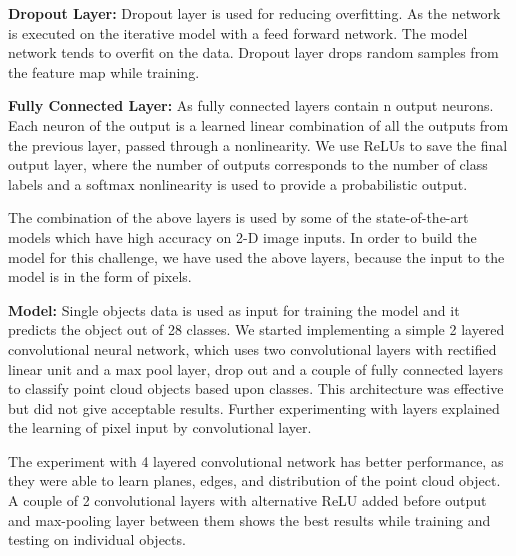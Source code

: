 \textbf{Dropout Layer:}
Dropout layer is used for reducing overfitting. As the network is executed on the iterative model with a feed forward network.
The model network tends to overfit on the data. Dropout layer drops random samples from the feature
map while training.

\textbf{Fully Connected Layer:}
As fully connected layers contain n output neurons. Each neuron of the output is a learned linear
combination of all the outputs from the previous layer, passed through a nonlinearity.
We use ReLUs to save the final output layer, where the number of outputs corresponds
to the number of class labels and a softmax nonlinearity is used to provide a probabilistic output.



The combination of the above layers is used by some of the state-of-the-art models which have high accuracy on 2-D image inputs.
In order to build the model for this challenge, we have used the above layers, because the input to the model is in the form of pixels.

\textbf{Model:}
Single objects data is used as input for training the model and it predicts the object out of 28 classes. We started implementing a simple 2 layered convolutional neural network,
which uses two convolutional layers with rectified linear unit and a max pool layer,
drop out and a couple of fully connected layers to classify point cloud objects based upon classes.
This architecture was effective but 
did not give acceptable results. 
Further experimenting with layers explained the learning of pixel input by convolutional layer.

The experiment with 4 layered convolutional network has better performance, as they were able to learn planes, edges, and distribution of the point cloud object.
A couple of 2 convolutional layers with alternative ReLU added before output and max-pooling layer between them shows the best results while training and testing on individual objects.

